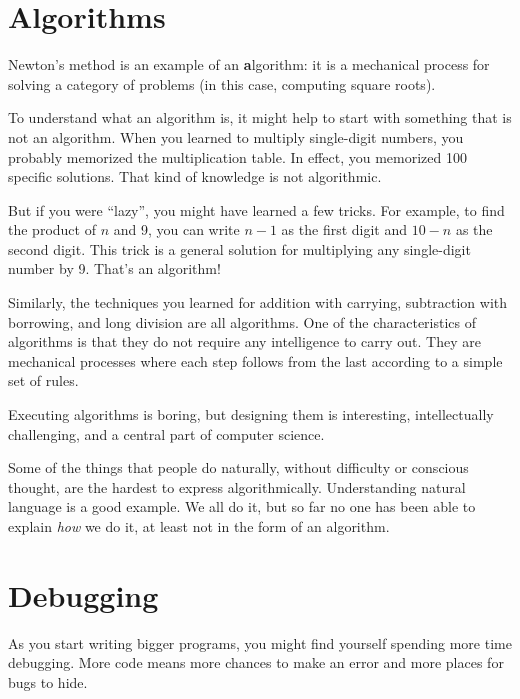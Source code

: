 \documentclass[
DIV=11,
fontsize=12,
twoside,
headinclude=false,
titlepage=firstiscover,
abstract=true,
headsepline=true,
footsepline=true,
chapterprefix=true, %
headings=big,
bibliography=totoc,%
captions=tableheading
]{scrbook}
\theoremstyle{definition}
\begin{document}
\section{Algorithms}

Newton's method is an example of an {\textbf algorithm}: it is a
mechanical process for solving a category of problems (in this
case, computing square roots).

To understand what an algorithm is, it might help to start with
something that is not an algorithm.  When you learned to multiply
single-digit numbers, you probably memorized the multiplication table.
In effect, you memorized 100 specific solutions.  That kind of
knowledge is not algorithmic.

But if you were ``lazy'', you might have learned a few
tricks.  For example, to find the product of $n$ and 9, you can
write $n-1$ as the first digit and $10-n$ as the second
digit.  This trick is a general solution for multiplying any
single-digit number by 9.  That's an algorithm!

Similarly, the techniques you learned for addition with carrying,
subtraction with borrowing, and long division are all algorithms.  One
of the characteristics of algorithms is that they do not require any
intelligence to carry out.  They are mechanical processes where
each step follows from the last according to a simple set of rules.

Executing algorithms is boring, but designing them is interesting,
intellectually challenging, and a central part of computer science.

Some of the things that people do naturally, without difficulty or
conscious thought, are the hardest to express algorithmically.
Understanding natural language is a good example.  We all do it, but
so far no one has been able to explain {\em how} we do it, at least
not in the form of an algorithm.


\section{Debugging}
\label{bisectbug}

As you start writing bigger programs, you might find yourself
spending more time debugging.  More code means more chances to
make an error and more places for bugs to hide.
\end{document}

